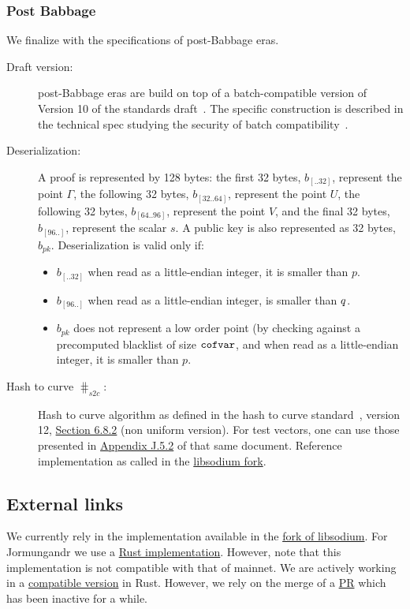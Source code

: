\subsubsection{Post Babbage}
We finalize with the specifications of post-Babbage eras.
\begin{description}
    \item[Draft version:] post-Babbage eras are build on top of a batch-compatible version of Version 10 of the
    standards draft~\cite{vrfdraft10}. The specific construction is described in
    the technical spec studying the security of batch compatibility~\cite{batchspec}.
    \item[Deserialization:] A \vrf proof is represented by 128 bytes: the first 32 bytes, $b_{[..32]}$, represent the
    point $\Gamma$, the following 32 bytes, $b_{[32..64]}$, represent the point $U$, the following 32 bytes,
    $b_{[64..96]}$, represent the point $V$, and the final 32 bytes, $b_{[96..]}$, represent the scalar $s$. A
    public key is also represented as 32 bytes, $b_{pk}$. Deserialization is valid only if:
    \begin{itemize}
        \item $b_{[..32]}$ when read as a little-endian integer, it is smaller than $p$.
        \item $b_{[96..]}$ when read as a little-endian integer, is smaller than $q$.
        \item $b_{pk}$ does not represent a low order point (by checking against a precomputed blacklist of size
        $\texttt{cofvar}$, and when read as a little-endian integer, it is smaller than $p$.
    \end{itemize}
    \item[Hash to curve $\hash_{s2c}$:] Hash to curve algorithm
    as defined in the hash to curve standard~\cite{h2cdraft13}, version 12, \href{https://datatracker.ietf
.org/doc/html/draft-irtf-cfrg-hash-to-curve-12#section-6.8.2}{Section 6.8.2} (non uniform version). For test
    vectors, one can use those presented in \href{https://datatracker.ietf
.org/doc/html/draft-irtf-cfrg-hash-to-curve-13#appendix-J.5.2}{Appendix J.5.2} of that same document. Reference
    implementation as called in the \href{https://github
.com/input-output-hk/libsodium/blob/iquerejeta/ECVRF-EDWARDS25519-SHA512-TAI/src/libsodium/crypto_vrf
/ietfdraft10/convert.c#L88}{libsodium fork}.
\end{description}

\subsection{External links}
We currently rely in the implementation available in the \href{https://github
.com/input-output-hk/libsodium/tree/iquerejeta/ECVRF-EDWARDS25519-SHA512-TAI/src/libsodium/crypto_vrf}{fork of
libsodium}. For Jormungandr we use a \href{https://github
.com/input-output-hk/chain-libs/tree/master/chain-crypto/src/algorithms/vrf}{Rust implementation}. However, note that
this implementation is not compatible with that of mainnet. We are actively working in a \href{https://github
.com/input-output-hk/vrf}{compatible version} in Rust. However, we rely on the merge of a \href{https://github.com/dalek-cryptography/curve25519-dalek/pull/377}{PR} which has been inactive for a while.
